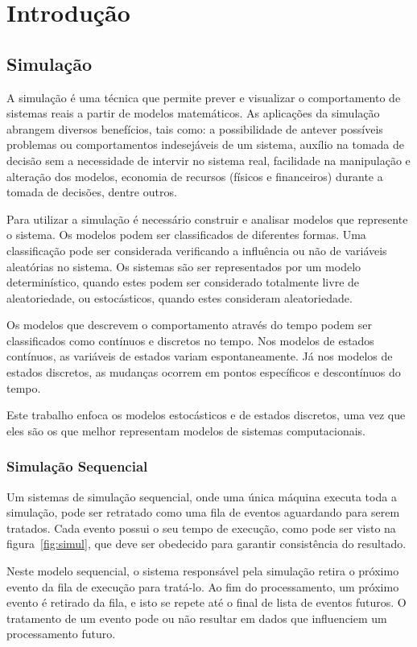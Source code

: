 \chapter{Introdução}
\section{Simulação}

A simulação é uma técnica que permite prever e visualizar o comportamento de sistemas reais a partir de modelos matemáticos. As aplicações da simulação abrangem diversos benefícios, tais como: a possibilidade de antever possíveis problemas ou comportamentos indesejáveis de um sistema, auxílio na tomada de decisão sem a necessidade de intervir no sistema real, facilidade na manipulação e alteração dos modelos, economia de recursos (físicos e financeiros) durante a tomada de decisões, dentre outros.

Para utilizar a simulação é necessário construir e analisar modelos que represente o sistema. Os modelos podem ser classificados de diferentes formas. Uma classificação pode ser considerada verificando a influência ou não de variáveis aleatórias no sistema. Os sistemas são ser representados por um modelo determinístico, quando estes podem ser considerado totalmente livre de aleatoriedade, ou estocásticos, quando estes consideram aleatoriedade.

Os modelos que descrevem o comportamento através do tempo podem ser classificados como contínuos e discretos no tempo. Nos modelos de estados contínuos, as variáveis de estados variam espontaneamente. Já nos modelos de estados discretos, as mudanças ocorrem em pontos específicos e descontínuos do tempo.

Este trabalho enfoca os modelos estocásticos e de estados discretos, uma vez que eles são os que melhor representam modelos de sistemas computacionais.

\subsection{Simulação Sequencial}

Um sistemas de simulação sequencial, onde uma única máquina executa toda a simulação, pode ser retratado como uma fila de eventos aguardando para serem tratados. Cada evento possui o seu tempo de execução, como pode ser visto na figura~\ref{fig:simul}, que deve ser obedecido para garantir consistência do resultado.

Neste modelo sequencial, o sistema responsável pela simulação retira o próximo evento da fila de execução para tratá-lo. Ao fim do processamento, um próximo evento é retirado da fila, e isto se repete até o final de lista de eventos futuros. O tratamento de um evento pode ou não resultar em dados que influenciem um processamento futuro.

